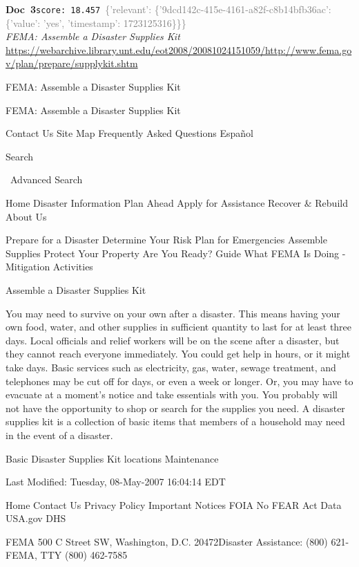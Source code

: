 \documentclass[a4paper,11pt]{article}
\begin{document}
\begin{docenv}
{\footnotesize\textcolor{doccolor}{\textbf{Doc~3}}}\hfill{\tiny\texttt{score:~18.457}}\ {\tiny\textcolor{gray}{\{'relevant': \{'9dcd142c-415e-4161-a82f-c8b14bfb36ac': \{'value': 'yes', 'timestamp': 1723125316\}\}\}}}\\[3pt]
{\small\textit{FEMA: Assemble a Disaster Supplies Kit}}\\[2pt]
{\tiny\url{https://webarchive.library.unt.edu/eot2008/20081024151059/http://www.fema.gov/plan/prepare/supplykit.shtm}}\\[4pt]
{\footnotesize FEMA: Assemble a Disaster Supplies Kit


FEMA: Assemble a Disaster Supplies Kit

Contact Us
Site Map
Frequently Asked Questions
Español

Search

 Advanced Search

Home
Disaster Information
Plan Ahead
Apply for Assistance
Recover \& Rebuild
About Us

Prepare for a Disaster
Determine Your Risk
Plan for Emergencies
Assemble Supplies
Protect Your Property
Are You Ready? Guide
What FEMA Is Doing - Mitigation Activities

Assemble a Disaster Supplies Kit

You may need to survive on your own after a disaster. This means having your own food, water, and other supplies in sufficient quantity to last for at least three days. Local officials and relief workers will be on the scene after a disaster, but they cannot reach everyone immediately. You could get help in hours, or it might take days.
Basic services such as electricity, gas, water, sewage treatment, and telephones may be cut off for days, or even a week or longer. Or, you may have to evacuate at a moment’s notice and take essentials with you. You probably will not have the opportunity to shop or search for the supplies you need.
A disaster supplies kit is a collection of basic items that members of a household may need in the event of a disaster.

Basic Disaster Supplies
Kit locations
Maintenance

Last Modified: Tuesday, 08-May-2007 16:04:14 EDT

Home
Contact Us
Privacy Policy
Important Notices
FOIA
No FEAR Act Data
USA.gov
DHS

FEMA 500 C Street SW, Washington, D.C. 20472Disaster Assistance: (800) 621-FEMA, TTY (800) 462-7585

 

}
\end{docenv}
\end{document}

